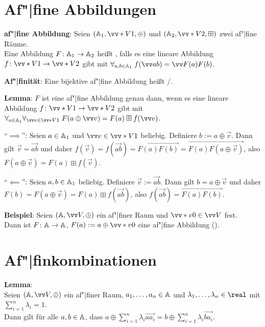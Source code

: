\pagebreak

\section{%
    Af"|fine Abbildungen%
}

\textbf{af"|fine Abbildung}:
Seien $(\AA_1, \vecs{V}{1}, \oplus)$ und $(\AA_2, \vecs{V}{2}, \boxplus)$ zwei af"|fine Räume.\\
Eine Abbildung $F\colon \AA_1 \to \AA_2$ heißt , falls
es eine lineare Abbildung $f\colon \vecs{V}{1} \to \vecs{V}{2}$ gibt mit
$\forall_{a, b \in \AA_1}\; f(\vec{ab}) = \vec{F(a)F(b)}$.

\textbf{Af"|finität}:
Eine bijektive af"|fine Abbildung heißt /.

\linie

\textbf{Lemma}:
$F$ ist eine af"|fine Abbildung genau dann, wenn es eine
lineare Abbildung $f\colon \vecs{V}{1} \to \vecs{V}{2}$ gibt mit
$\forall_{a \in \AA_1} \forall_{\vec{v} \in \vecs{V}{1}}\;
F(a \oplus \vec{v}) = F(a) \boxplus f(\vec{v})$.

\begin{Beweis}
    "`$\implies$"':
    Seien $a \in \AA_1$ und $\vec{v} \in \vecs{V}{1}$ beliebig.
    Definiere $b := a \oplus \vec{v}$.
    Dann gilt $\vec{v} = \vec{ab}$ und daher
    $f(\vec{v}) = f(\vec{ab}) = \vec{F(a)F(b)} = \vec{F(a) F(a \oplus \vec{v})}$,
    also $F(a \oplus \vec{v}) = F(a) \boxplus f(\vec{v})$.

    "`$\impliedby$"':
    Seien $a, b \in \AA_1$ beliebig.
    Definiere $\vec{v} := \vec{ab}$.
    Dann gilt $b = a \oplus \vec{v}$ und daher\\
    $F(b) = F(a \oplus \vec{v}) = F(a) \boxplus f(\vec{ab})$,
    also $f(\vec{ab}) = \vec{F(a)F(b)}$.
\end{Beweis}

\linie

\textbf{Beispiel}:
Seien $(\AA, \vec{V}, \oplus)$ ein af"|finer Raum und $\vecs{v}{0} \in \vec{V}$ fest.\\
Dann ist $F\colon \AA \to \AA$, $F(a) := a \oplus \vecs{v}{0}$
eine af"|fine Abbildung ().

\section{%
    Af"|finkombinationen%
}

\textbf{Lemma}:\\
Seien $(\AA, \vec{V}, \oplus)$ ein af"|finer Raum,
$a_1, \dotsc, a_n \in \AA$ und $\lambda_1, \dotsc, \lambda_n \in \real$
mit $\sum_{i=1}^n \lambda_i = 1$.\\
Dann gilt für alle $a, b \in \AA$, dass
$a \oplus \sum_{i=1}^n \lambda_i \vec{aa_i} = b \oplus \sum_{i=1}^n \lambda_i \vec{ba_i}$.

